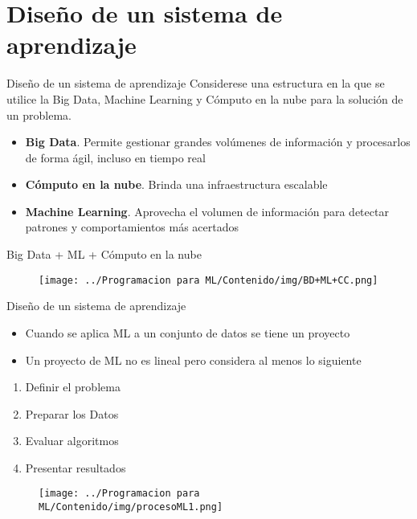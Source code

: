 \documentclass[11pt,aspectratio=169]{beamer}
\begin{document}
\section{Diseño de un sistema de aprendizaje}
\begin{frame}{Diseño de un sistema de aprendizaje}
Considerese una estructura en la que se utilice la Big Data, Machine Learning y Cómputo en la nube para la solución de un problema.\pause

\begin{itemize}
	\item \textbf{Big Data}. Permite gestionar grandes volúmenes de información y procesarlos de forma ágil, incluso en tiempo real\pause
	\item \textbf{Cómputo en la nube}. Brinda una infraestructura escalable \pause
	\item \textbf{Machine Learning}. Aprovecha el volumen de información para detectar patrones y comportamientos más acertados
\end{itemize}
\end{frame}

\begin{frame}{Big Data + ML + Cómputo en la nube}
\begin{figure}
	\centering
	\texttt{[image: ../Programacion para ML/Contenido/img/BD+ML+CC.png]}
\end{figure}
\end{frame}

\begin{frame}{Diseño de un sistema de aprendizaje}
\begin{itemize}\pause
	\item Cuando se aplica ML a un conjunto de datos se tiene un proyecto\pause
	\item Un proyecto de ML no es lineal pero considera al menos lo siguiente\pause
\end{itemize}

\begin{enumerate}
	\item Definir el problema\pause
	\item Preparar los Datos\pause
	\item Evaluar algoritmos\pause
	\item Presentar resultados
\end{enumerate}
\end{frame}

\begin{frame}{}
\begin{figure}[H]
	\centering
	\texttt{[image: ../Programacion para ML/Contenido/img/procesoML1.png]}
\end{figure}
\end{frame}
\end{document}
